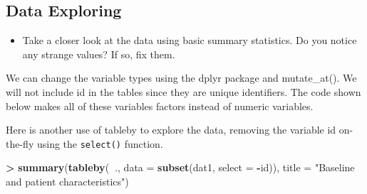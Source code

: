\documentclass[
]{book}
\newenvironment{Shaded}{\begin{snugshade}}{\end{snugshade}}
\newcommand{\DataTypeTok}[1]{\textcolor[rgb]{0.13,0.29,0.53}{#1}}
\newcommand{\KeywordTok}[1]{\textcolor[rgb]{0.13,0.29,0.53}{\textbf{#1}}}
\newcommand{\NormalTok}[1]{#1}
\newcommand{\OperatorTok}[1]{\textcolor[rgb]{0.81,0.36,0.00}{\textbf{#1}}}
\newcommand{\StringTok}[1]{\textcolor[rgb]{0.31,0.60,0.02}{#1}}
\providecommand{\tightlist}{%
  \setlength{\itemsep}{0pt}\setlength{\parskip}{0pt}}
\begin{document}
\hypertarget{alt-explore}{%
\subsection{Data Exploring}\label{alt-explore}}

\begin{itemize}
\tightlist
\item
  Take a closer look at the data using basic summary statistics. Do you notice any strange values? If so, fix them.
\end{itemize}

We can change the variable types using the dplyr package and mutate\_at(). We will not include id in the tables since they are unique identifiers. The code shown below makes all of these variables factors instead of numeric variables.

\begin{Shaded}
\end{Shaded}

Here is another use of tableby to explore the data, removing the variable id on-the-fly using the \texttt{select()} function.

\begin{Shaded}
\begin{Highlighting}[]
\OperatorTok{>}\StringTok{ }\KeywordTok{summary}\NormalTok{(}\KeywordTok{tableby}\NormalTok{(}\OperatorTok{~}\NormalTok{., }\DataTypeTok{data =} \KeywordTok{subset}\NormalTok{(dat1, }\DataTypeTok{select =} \OperatorTok{-}\NormalTok{id)), }\DataTypeTok{title =} \StringTok{"Baseline and patient characteristics"}\NormalTok{)}
\end{Highlighting}
\end{Shaded}
\end{document}
